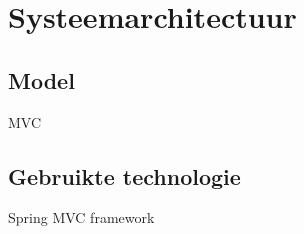 \chapter{Systeemarchitectuur}
\section{Model}
MVC

\section{Gebruikte technologie}
Spring MVC framework
